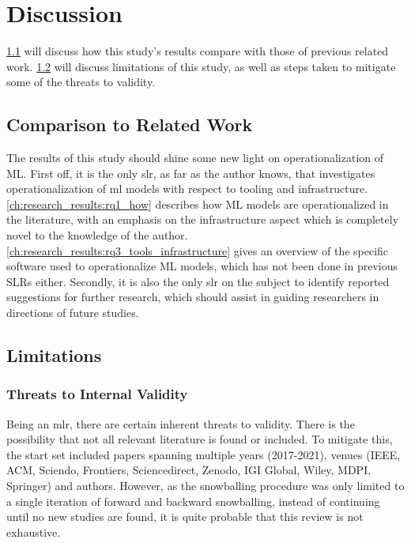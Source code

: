 \chapter{Discussion}
\label{ch:discussion}
\cref{ch:discussion:comparison_to_related_work} will discuss how this study's results compare with those of previous related work.
\cref{ch:discussion:limitations} will discuss limitations of this study, as well as steps taken to mitigate some of the threats to validity.

\section{Comparison to Related Work}
\label{ch:discussion:comparison_to_related_work}
The results of this study should shine some new light on operationalization of ML.
First off, it is the only \acrshort{slr}, as far as the author knows, that investigates operationalization of \acrshort{ml} models with respect to tooling and infrastructure.
\cref{ch:research_results:rq1_how} describes how ML models are operationalized in the literature, with an emphasis on the infrastructure aspect which is completely novel to the knowledge of the author.
\cref{ch:research_results:rq3_tools_infrastructure} gives an overview of the specific software used to operationalize ML models, which has not been done in previous SLRs either.
Secondly, it is also the only \acrshort{slr} on the subject to identify reported suggestions for further research, which should assist in guiding researchers in directions of future studies.

\section{Limitations}
\label{ch:discussion:limitations}
\subsection{Threats to Internal Validity}
Being an \acrshort{mlr}, there are certain inherent threats to validity.
There is the possibility that not all relevant literature is found or included.
To mitigate this, the start set included papers spanning multiple years (2017-2021), venues (IEEE, ACM, Sciendo, Frontiers, Sciencedirect, Zenodo, IGI Global, Wiley, MDPI, Springer) and authors.
However, as the snowballing procedure was only limited to a single iteration of forward and backward snowballing, instead of continuing until no new studies are found, it is quite probable that this review is not exhaustive.

